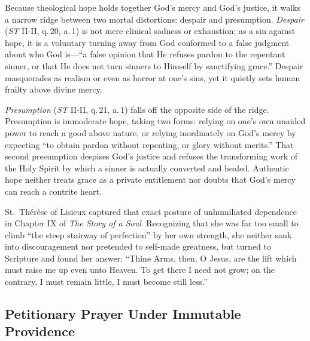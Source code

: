 Because theological hope holds together God's mercy and God's justice, it walks a narrow ridge between two mortal distortions: despair and presumption. \emph{Despair} (\emph{ST} II-II, q.\,20, a.\,1) is not mere clinical sadness or exhaustion; as a sin against hope, it is a voluntary turning away from God conformed to a false judgment about who God is---``a false opinion that He refuses pardon to the repentant sinner, or that He does not turn sinners to Himself by sanctifying grace.'' Despair masquerades as realism or even as horror at one's sins, yet it quietly sets human frailty above divine mercy.

\emph{Presumption} (\emph{ST} II-II, q.\,21, a.\,1) falls off the opposite side of the ridge. Presumption is immoderate hope, taking two forms: relying on one's own unaided power to reach a good above nature, or relying inordinately on God's mercy by expecting ``to obtain pardon without repenting, or glory without merits.'' That second presumption despises God's justice and refuses the transforming work of the Holy Spirit by which a sinner is actually converted and healed. Authentic hope neither treats grace as a private entitlement nor doubts that God's mercy can reach a contrite heart.

St.\ Th\'er\`ese of Lisieux captured that exact posture of unhumiliated dependence in Chapter IX of \emph{The Story of a Soul}. Recognizing that she was far too small to climb ``the steep stairway of perfection'' by her own strength, she neither sank into discouragement nor pretended to self-made greatness, but turned to Scripture and found her answer: ``Thine Arms, then, O Jesus, are the lift which must raise me up even unto Heaven. To get there I need not grow; on the contrary, I must remain little, I must become still less.''

\subsection*{Petitionary Prayer Under Immutable Providence}

